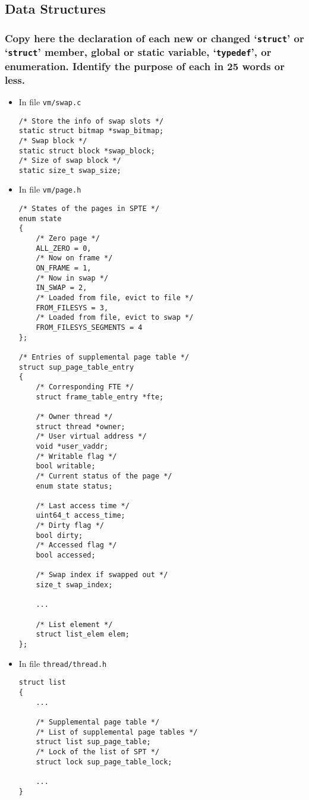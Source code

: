 \documentclass[sigconf, nonacm, balance=false, urlbreakonhyphens=true]{acmart}
\begin{document}
        \subsection{Data Structures}
            
            \subsubsection{Copy here the declaration of each new or changed `\texttt{struct}' or `\texttt{struct}' member, global or static variable, `\texttt{typedef}', or enumeration. Identify the purpose of each in 25 words or less. } 

                \begin{itemize}
                    \item In file \texttt{vm/swap.c}
\begin{verbatim}
/* Store the info of swap slots */
static struct bitmap *swap_bitmap;
/* Swap block */
static struct block *swap_block;
/* Size of swap block */
static size_t swap_size;
\end{verbatim}
                    \item In file \texttt{vm/page.h}
\begin{verbatim}
/* States of the pages in SPTE */
enum state
{
    /* Zero page */
    ALL_ZERO = 0,
    /* Now on frame */ 
    ON_FRAME = 1,
    /* Now in swap */
    IN_SWAP = 2,
    /* Loaded from file, evict to file */
    FROM_FILESYS = 3,
    /* Loaded from file, evict to swap */
    FROM_FILESYS_SEGMENTS = 4
};

/* Entries of supplemental page table */
struct sup_page_table_entry
{
    /* Corresponding FTE */
    struct frame_table_entry *fte;
    
    /* Owner thread */
    struct thread *owner;
    /* User virtual address */
    void *user_vaddr;
    /* Writable flag */
    bool writable;
    /* Current status of the page */
    enum state status;

    /* Last access time */
    uint64_t access_time;
    /* Dirty flag */
    bool dirty;
    /* Accessed flag */
    bool accessed;

    /* Swap index if swapped out */
    size_t swap_index;

    ...

    /* List element */
    struct list_elem elem;
};
\end{verbatim}
                \item In file \texttt{thread/thread.h}
\begin{verbatim}
struct list
{
    ...
    
    /* Supplemental page table */
    /* List of supplemental page tables */
    struct list sup_page_table;
    /* Lock of the list of SPT */
    struct lock sup_page_table_lock;

    ...
}
\end{verbatim}
                \end{itemize}
\end{document}
